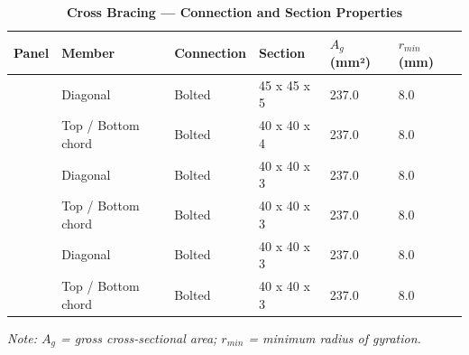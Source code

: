 \documentclass[12pt,a4paper]{report}
\numberwithin{table}{chapter}
\numberwithin{figure}{chapter}
\begin{document}
\vspace{1em}

\vspace{0.4em}
\noindent
\setlength{\tabcolsep}{4pt}
\setlength\LTleft{0pt}
\setlength\LTright{\fill}

\begin{longtable}{|C{2.0cm}|L{2.0cm}|L{2.2cm}|C{2.5cm}|C{2.0cm}|C{2.0cm}|}
\caption{\textbf{Cross Bracing --- Connection and Section Properties}}
\hline
\textbf{Panel} & \textbf{Member} & \textbf{Connection} & \textbf{Section} & \textbf{$A_g$ (mm²)} & \textbf{$r_{min}$ (mm)} \\[6pt]
\hline
{} & Diagonal & Bolted & 45 x 45 x 5 & 237.0 & 8.0 \\[6pt]
 & Top / Bottom chord & Bolted & 40 x 40 x 4 & 237.0 & 8.0 \\[6pt]
\hline
{} & Diagonal & Bolted & 40 x 40 x 3 & 237.0 & 8.0 \\[6pt]
 & Top / Bottom chord & Bolted & 40 x 40 x 3 & 237.0 & 8.0 \\[6pt]
\hline
{} & Diagonal & Bolted & 40 x 40 x 3 & 237.0 & 8.0 \\[6pt]
 & Top / Bottom chord & Bolted & 40 x 40 x 3 & 237.0 & 8.0 \\[6pt]
\hline
\end{longtable}
\noindent\textit{Note: $A_g$ = gross cross-sectional area; $r_{min}$ = minimum radius of gyration.}
\end{document}
